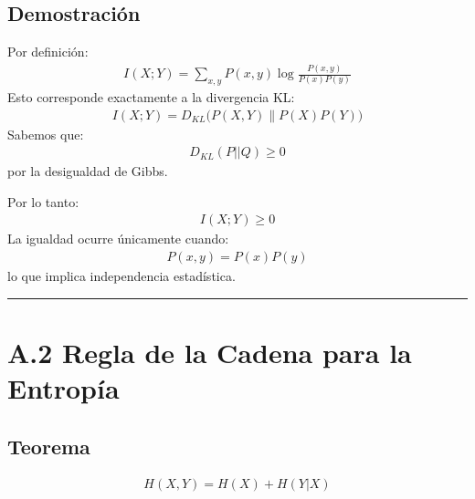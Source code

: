 \documentclass[letterpaper,10pt,english]{jupyterBook}
\begin{document}
\subsection{Demostración}
\label{\detokenize{05_appendices/proofs:demostracion}}
\sphinxAtStartPar
Por definición:
\begin{equation*}
\begin{split}
I(X;Y)=
\sum_{x,y} P(x,y)
\log \frac{P(x,y)}{P(x)P(y)}
\end{split}
\end{equation*}
\sphinxAtStartPar
Esto corresponde exactamente a la divergencia KL:
\begin{equation*}
\begin{split}
I(X;Y)=
D_{KL}\big(P(X,Y)\parallel P(X)P(Y)\big)
\end{split}
\end{equation*}
\sphinxAtStartPar
Sabemos que:
\begin{equation*}
\begin{split}
D_{KL}(P||Q)\ge 0
\end{split}
\end{equation*}
\sphinxAtStartPar
por la desigualdad de Gibbs.

\sphinxAtStartPar
Por lo tanto:
\begin{equation*}
\begin{split}
I(X;Y)\ge0
\end{split}
\end{equation*}
\sphinxAtStartPar
La igualdad ocurre únicamente cuando:
\begin{equation*}
\begin{split}
P(x,y)=P(x)P(y)
\end{split}
\end{equation*}
\sphinxAtStartPar
lo que implica independencia estadística.


\bigskip\hrule\bigskip



\section{A.2 Regla de la Cadena para la Entropía}
\label{\detokenize{05_appendices/proofs:a-2-regla-de-la-cadena-para-la-entropia}}

\subsection{Teorema}
\label{\detokenize{05_appendices/proofs:id1}}\begin{equation*}
\begin{split}
H(X,Y)=H(X)+H(Y|X)
\end{split}
\end{equation*}
\end{document}
